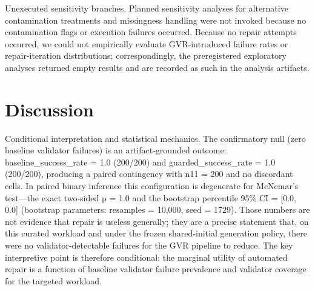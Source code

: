 \documentclass[conference]{IEEEtran}
\begin{document}
Unexecuted sensitivity branches. Planned sensitivity analyses for alternative contamination treatments and missingness handling were not invoked because no contamination flags or execution failures occurred. Because no repair attempts occurred, we could not empirically evaluate GVR‑introduced failure rates or repair‑iteration distributions; correspondingly, the preregistered exploratory analyses returned empty results and are recorded as such in the analysis artifacts.

\section{Discussion}
Conditional interpretation and statistical mechanics. The confirmatory null (zero baseline validator failures) is an artifact‑grounded outcome: baseline\_success\_rate = 1.0 (200/200) and guarded\_success\_rate = 1.0 (200/200), producing a paired contingency with n11 = 200 and no discordant cells. In paired binary inference this configuration is degenerate for McNemar's test---the exact two‑sided p = 1.0 and the bootstrap percentile 95\% CI = [0.0, 0.0] (bootstrap parameters: resamples = 10,000, seed = 1729). Those numbers are not evidence that repair is useless generally; they are a precise statement that, on this curated workload and under the frozen shared‑initial generation policy, there were no validator‑detectable failures for the GVR pipeline to reduce. The key interpretive point is therefore conditional: the marginal utility of automated repair is a function of baseline validator failure prevalence and validator coverage for the targeted workload.
\end{document}
